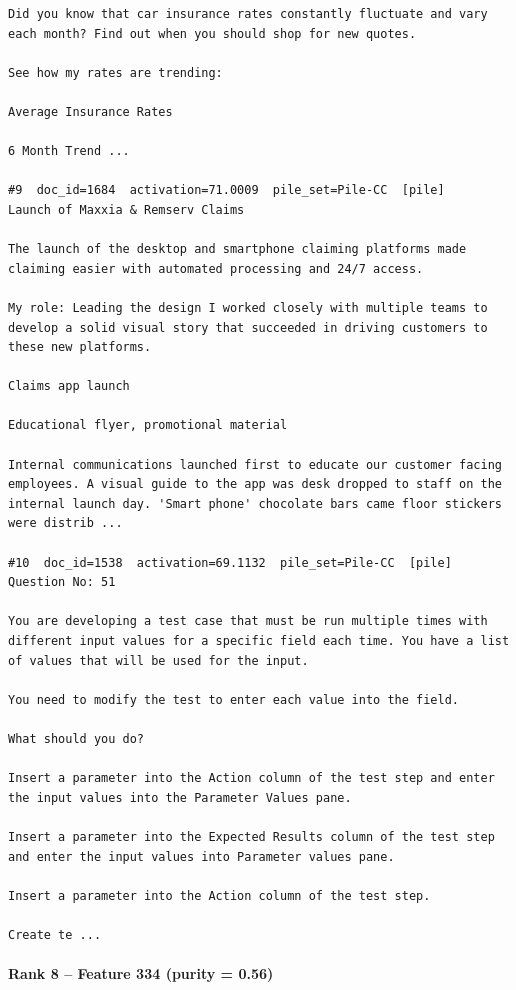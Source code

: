 \begin{verbatim}
Did you know that car insurance rates constantly fluctuate and vary each month? Find out when you should shop for new quotes.

See how my rates are trending:

Average Insurance Rates

6 Month Trend ...

#9  doc_id=1684  activation=71.0009  pile_set=Pile-CC  [pile]
Launch of Maxxia & Remserv Claims

The launch of the desktop and smartphone claiming platforms made claiming easier with automated processing and 24/7 access.

My role: Leading the design I worked closely with multiple teams to develop a solid visual story that succeeded in driving customers to these new platforms.

Claims app launch

Educational flyer, promotional material

Internal communications launched first to educate our customer facing employees. A visual guide to the app was desk dropped to staff on the internal launch day. 'Smart phone' chocolate bars came floor stickers were distrib ...

#10  doc_id=1538  activation=69.1132  pile_set=Pile-CC  [pile]
Question No: 51

You are developing a test case that must be run multiple times with different input values for a specific field each time. You have a list of values that will be used for the input.

You need to modify the test to enter each value into the field.

What should you do?

Insert a parameter into the Action column of the test step and enter the input values into the Parameter Values pane.

Insert a parameter into the Expected Results column of the test step and enter the input values into Parameter values pane.

Insert a parameter into the Action column of the test step.

Create te ...

\end{verbatim}

\paragraph*{Rank 8 -- Feature 334 (purity = 0.56)}

